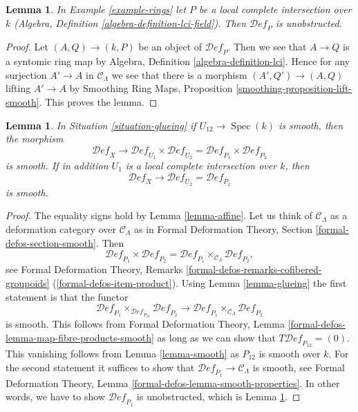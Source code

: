 \documentclass{stacks-project}
\theoremstyle{plain}
\newtheorem{lemma}[subsection]{Lemma}
\theoremstyle{definition}
\theoremstyle{remark}
\numberwithin{equation}{subsection}
\def\Spec{\mathop{\mathrm{Spec}}}
\def\Deformationcategory{\mathcal{D}\!\mathit{ef}}
\begin{document}
\begin{lemma}
\label{lemma-lci-unobstructed}
In Example \ref{example-rings} let $P$ be a local complete
intersection over $k$ (Algebra, Definition \ref{algebra-definition-lci-field}).
Then $\Deformationcategory_P$ is unobstructed.
\end{lemma}

\begin{proof}
Let $(A, Q) \to (k, P)$ be an object of $\Deformationcategory_P$.
Then we see that $A \to Q$ is a syntomic ring map by
Algebra, Definition \ref{algebra-definition-lci}.
Hence for any surjection $A' \to A$ in $\mathcal{C}_\Lambda$
we see that there is a morphism $(A', Q') \to (A, Q)$
lifting $A' \to A$ by
Smoothing Ring Maps, Proposition \ref{smoothing-proposition-lift-smooth}.
This proves the lemma.
\end{proof}

\begin{lemma}
\label{lemma-glueing-smooth}
In Situation \ref{situation-glueing} if $U_{12} \to \Spec(k)$ is smooth,
then the morphism
$$
\Deformationcategory_X
\longrightarrow
\Deformationcategory_{U_1} \times \Deformationcategory_{U_2} =
\Deformationcategory_{P_1} \times \Deformationcategory_{P_2}
$$
is smooth. If in addition
$U_1$ is a local complete intersection over $k$, then
$$
\Deformationcategory_X
\longrightarrow
\Deformationcategory_{U_2} = \Deformationcategory_{P_2}
$$
is smooth.
\end{lemma}

\begin{proof}
The equality signs hold by Lemma \ref{lemma-affine}.
Let us think of $\mathcal{C}_\Lambda$ as a deformation
category over $\mathcal{C}_\Lambda$ as in
Formal Deformation Theory, Section \ref{formal-defos-section-smooth}.
Then
$$
\Deformationcategory_{P_1} \times \Deformationcategory_{P_2} =
\Deformationcategory_{P_1}
\times_{\mathcal{C}_\Lambda}
\Deformationcategory_{P_2},
$$
see Formal Deformation Theory, Remarks
\ref{formal-defos-remarks-cofibered-groupoids}
(\ref{formal-defos-item-product}).
Using
Lemma \ref{lemma-glueing}
the first statement is that the functor
$$
\Deformationcategory_{P_1}
\times_{\Deformationcategory_{P_{12}}}
\Deformationcategory_{P_2}
\longrightarrow
\Deformationcategory_{P_1}
\times_{\mathcal{C}_\Lambda}
\Deformationcategory_{P_2}
$$
is smooth. This follows from Formal Deformation Theory, Lemma
\ref{formal-defos-lemma-map-fibre-products-smooth} as long as
we can show that $T\Deformationcategory_{P_{12}} = (0)$.
This vanishing follows from Lemma \ref{lemma-smooth}
as $P_{12}$ is smooth over $k$.
For the second statement it suffices to show that
$\Deformationcategory_{P_1} \to \mathcal{C}_\Lambda$
is smooth, see Formal Deformation Theory, Lemma
\ref{formal-defos-lemma-smooth-properties}.
In other words, we have to show $\Deformationcategory_{P_1}$
is unobstructed, which is Lemma \ref{lemma-lci-unobstructed}.
\end{proof}
\end{document}

